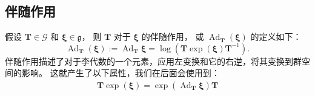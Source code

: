 \subsection{伴随作用}

假设 $\mathbf{T} \in \mathcal{G}$ 和 $\boldsymbol{\xi} \in \mathfrak{g}$， 则 $\mathbf{T}$ 对于 $\boldsymbol{\xi}$ 的伴随作用， 或 $\operatorname{Ad}_\mathbf{T}(\boldsymbol{\xi})$ 的定义如下：
\begin{equation}
    \operatorname{Ad}_\mathbf{T}(\boldsymbol{\xi}) := \operatorname{Ad}_\mathbf{T} \boldsymbol{\xi} = \operatorname{log}( \mathbf{T} \operatorname{exp} ( \boldsymbol{\xi} ) \mathbf{T}^{-1} ).
\end{equation}
伴随作用描述了对于李代数的一个元素，应用左变换和它的右逆，将其变换到群空间的影响。 
这就产生了以下属性，我们在后面会使用到： 
\begin{align}
    \mathbf{T} \operatorname{exp} ( \boldsymbol{\xi} ) = \operatorname{exp} ( \operatorname{Ad}_\mathbf{T} \boldsymbol{\xi} ) \mathbf{T} \label{eq:adjoint_property}
\end{align}


